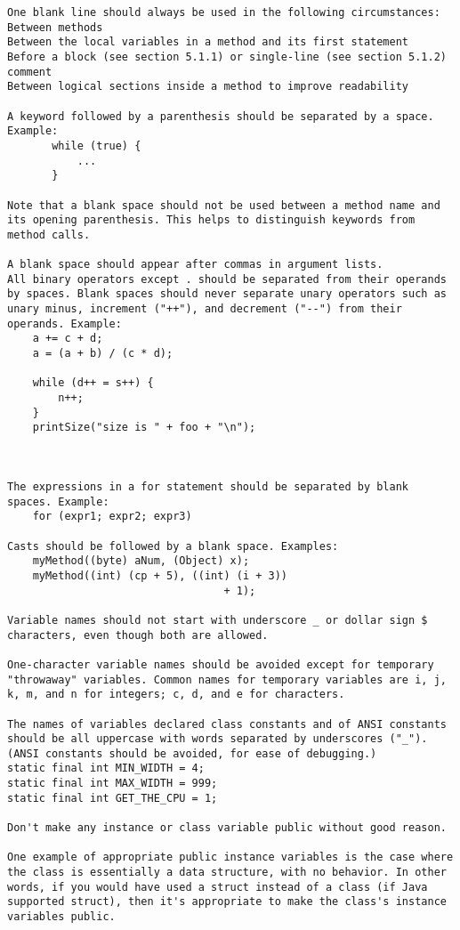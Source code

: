 \begin{lstlisting}
One blank line should always be used in the following circumstances:
Between methods
Between the local variables in a method and its first statement
Before a block (see section 5.1.1) or single-line (see section 5.1.2) comment
Between logical sections inside a method to improve readability

A keyword followed by a parenthesis should be separated by a space. Example:
       while (true) {
           ...
       }

Note that a blank space should not be used between a method name and its opening parenthesis. This helps to distinguish keywords from method calls.

A blank space should appear after commas in argument lists.
All binary operators except . should be separated from their operands by spaces. Blank spaces should never separate unary operators such as unary minus, increment ("++"), and decrement ("--") from their operands. Example:
    a += c + d;
    a = (a + b) / (c * d);
    
    while (d++ = s++) {
        n++;
    }
    printSize("size is " + foo + "\n");
	


The expressions in a for statement should be separated by blank spaces. Example:
    for (expr1; expr2; expr3)

Casts should be followed by a blank space. Examples:
    myMethod((byte) aNum, (Object) x);
    myMethod((int) (cp + 5), ((int) (i + 3)) 
                                  + 1);
								  
Variable names should not start with underscore _ or dollar sign $ characters, even though both are allowed.

One-character variable names should be avoided except for temporary "throwaway" variables. Common names for temporary variables are i, j, k, m, and n for integers; c, d, and e for characters.

The names of variables declared class constants and of ANSI constants should be all uppercase with words separated by underscores ("_"). (ANSI constants should be avoided, for ease of debugging.)
static final int MIN_WIDTH = 4;
static final int MAX_WIDTH = 999;
static final int GET_THE_CPU = 1;

Don't make any instance or class variable public without good reason.

One example of appropriate public instance variables is the case where the class is essentially a data structure, with no behavior. In other words, if you would have used a struct instead of a class (if Java supported struct), then it's appropriate to make the class's instance variables public.


\end{lstlisting}
